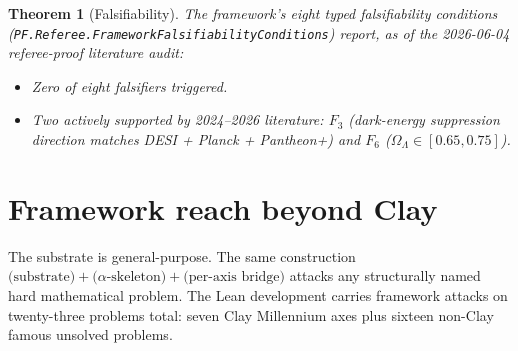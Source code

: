 \documentclass[11pt,a4paper]{article}
\theoremstyle{plain}
\newtheorem{theorem}{Theorem}[section]
\theoremstyle{definition}
\begin{document}
\begin{theorem}[Falsifiability]
The framework's eight typed falsifiability conditions
(\texttt{PF.Referee.FrameworkFalsifiabilityConditions}) report,
as of the 2026-06-04 referee-proof literature audit:
\begin{itemize}[leftmargin=*,nosep]
\item Zero of eight falsifiers triggered.
\item Two actively supported by 2024--2026 literature: $F_{3}$
(dark-energy suppression direction matches DESI + Planck +
Pantheon+) and $F_{6}$ ($\Omega_{\Lambda} \in [0.65, 0.75]$).
\end{itemize}
\end{theorem}

\section{Framework reach beyond Clay}
\label{sec:reach}

The substrate is general-purpose. The same construction
$\text{(substrate)} + \text{($\alpha$-skeleton)} + \text{(per-axis bridge)}$
attacks any structurally named hard mathematical problem. The Lean
development carries framework attacks on twenty-three problems
total: seven Clay Millennium axes plus sixteen non-Clay famous
unsolved problems.
\end{document}
